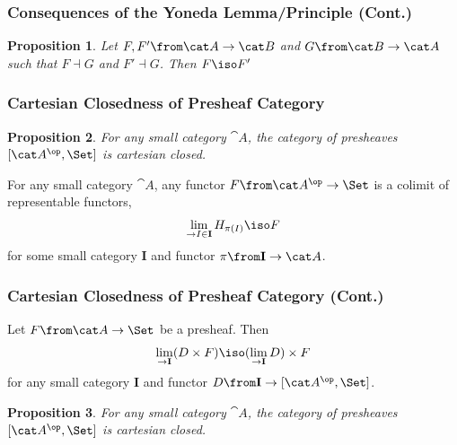 \documentclass{beamer}
\newtheorem{proposition}{Proposition}
\begin{document}
\begin{frame}
  \frametitle{Consequences of the Yoneda Lemma/Principle (Cont.)}
  \begin{proposition}
    Let $F,F'\from \cat A\to\cat B$ and $G\from\cat B\to\cat A$ such that $F\dashv G$ and $F'\dashv G$. Then $F\iso F'$
  \end{proposition}
\end{frame}

\begin{frame}
  \frametitle{Cartesian Closedness of Presheaf Category}
  \begin{proposition}
    For any small category $\cat A$, the category of presheaves $[\cat A^\op,\Set]$ is cartesian closed.
  \end{proposition}
  \pause
  \begin{lemma}
    For any small category $\cat A$, any functor $F\from\cat A^\op\to\Set$ is a colimit of representable functors,
    \begin{align*}
      \lim_{\to I\in\mathbf I} H_{\pi(I)}\iso F
    \end{align*}
    for some small category $\mathbf I$ and functor $\pi\from \mathbf I\to \cat A$.
  \end{lemma}
\end{frame}

\begin{frame}
  \frametitle{Cartesian Closedness of Presheaf Category (Cont.)}  
  \begin{lemma}
    Let $F\from \cat A\to\Set$ be a presheaf. Then
    \begin{align*}
      \lim_{\to \mathbf I} (D\times F)\iso (\lim_{\to \mathbf I} D)\times F
    \end{align*}
    for any small category $\mathbf I$ and functor $D\from\mathbf I\to [\cat A^\op,\Set]$.
  \end{lemma}
  \pause
  \begin{proposition}
    For any small category $\cat A$, the category of presheaves $[\cat A^\op,\Set]$ is cartesian closed.
  \end{proposition}
\end{frame}
\end{document}
